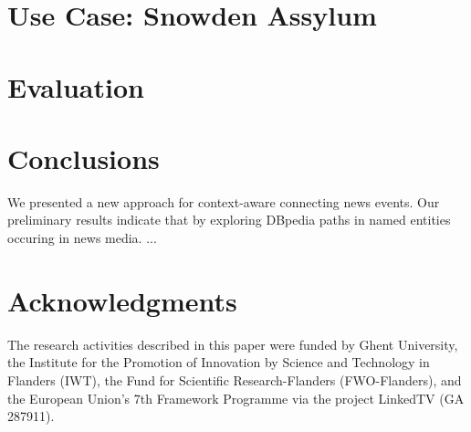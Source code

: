 \documentclass{acm_proc_article-sp}
\begin{document}
\section{Use Case: Snowden Assylum}

\section{Evaluation}

\section{Conclusions}
We presented a new approach for context-aware connecting news events. Our preliminary results indicate that by exploring DBpedia paths in named entities occuring in news media. ...

\section{Acknowledgments}
The research activities described in this paper were funded by Ghent University,
the Institute for the Promotion of Innovation by Science and Technology in Flanders (IWT), the Fund for Scientific Research-Flanders (FWO-Flanders), and the European Union's 7th Framework Programme via the project LinkedTV (GA 287911).

%

%
%
\end{document}
